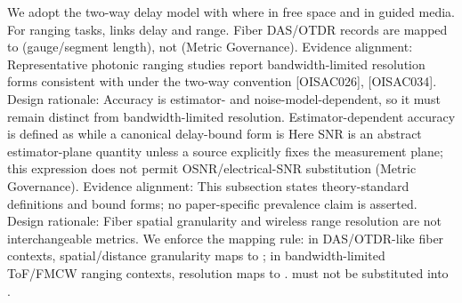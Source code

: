 {}We adopt the two-way delay model with\markdownRendererSoftLineBreak
{}\markdownRendererSoftLineBreak
{}where  in free space and  in guided media. For ranging tasks,  links delay and range. Fiber DAS/OTDR records are mapped to  (gauge/segment length), not  (Metric Governance).\markdownRendererParagraphSeparator
{}Evidence alignment: Representative photonic ranging studies report bandwidth-limited resolution forms consistent with  under the two-way convention [O\markdownRendererUnderscore{}ISAC\markdownRendererUnderscore{}026], [O\markdownRendererUnderscore{}ISAC\markdownRendererUnderscore{}034].\markdownRendererInterblockSeparator
{}
\markdownRendererSectionEnd \markdownRendererSectionBegin
{}\markdownRendererInterblockSeparator
{}Design rationale: Accuracy is estimator- and noise-model-dependent, so it must remain distinct from bandwidth-limited resolution.\markdownRendererParagraphSeparator
{}Estimator-dependent accuracy is defined as\markdownRendererSoftLineBreak
{}\markdownRendererSoftLineBreak
{}while a canonical delay-bound form is\markdownRendererSoftLineBreak
{}\markdownRendererSoftLineBreak
{}Here SNR is an abstract estimator-plane quantity unless a source explicitly fixes the measurement plane; this expression does not permit OSNR/electrical-SNR substitution (Metric Governance).\markdownRendererParagraphSeparator
{}Evidence alignment: This subsection states theory-standard definitions and bound forms; no paper-specific prevalence claim is asserted.\markdownRendererInterblockSeparator
{}
\markdownRendererSectionEnd \markdownRendererSectionBegin
{}\markdownRendererInterblockSeparator
{}Design rationale: Fiber spatial granularity and wireless range resolution are not interchangeable metrics.\markdownRendererParagraphSeparator
{}We enforce the mapping rule: in DAS/OTDR-like fiber contexts, spatial/distance granularity maps to ; in bandwidth-limited ToF/FMCW ranging contexts, resolution maps to .   must not be substituted into .\markdownRendererParagraphSeparator
